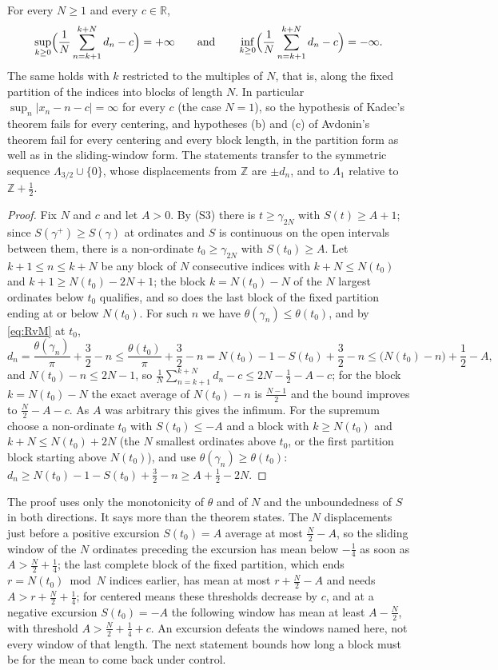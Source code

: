 \documentclass[11pt]{article}
\newcommand{\R}{\mathbb{R}}
\newcommand{\Z}{\mathbb{Z}}
\newcommand{\Lam}{\Lambda}
\begin{document}
\begin{theorem}\label{thm:kadec}
For every $N\ge1$ and every $c\in\R$,
\[
\sup_{k\ge0}\Bigl(\frac1N\sum_{n=k+1}^{k+N}d_n-c\Bigr)=+\infty
\qquad\text{and}\qquad
\inf_{k\ge0}\Bigl(\frac1N\sum_{n=k+1}^{k+N}d_n-c\Bigr)=-\infty .
\]
The same holds with $k$ restricted to the multiples of $N$, that is, along the fixed partition of the indices into blocks of length $N$. In particular $\sup_n|x_n-n-c|=\infty$ for every $c$ (the case $N=1$), so the hypothesis of Kadec's theorem fails for every centering, and hypotheses (b) and (c) of Avdonin's theorem fail for every centering and every block length, in the partition form as well as in the sliding-window form. The statements transfer to the symmetric sequence $\Lam_{3/2}\cup\{0\}$, whose displacements from $\Z$ are $\pm d_n$, and to $\Lam_1$ relative to $\Z+\frac12$.
\end{theorem}

\begin{proof}
Fix $N$ and $c$ and let $A>0$. By (S3) there is $t\ge\gamma_{2N}$ with $S(t)\ge A+1$; since $S(\gamma^+)\ge S(\gamma)$ at ordinates and $S$ is continuous on the open intervals between them, there is a non-ordinate $t_0\ge\gamma_{2N}$ with $S(t_0)\ge A$. Let $k+1\le n\le k+N$ be any block of $N$ consecutive indices with $k+N\le N(t_0)$ and $k+1\ge N(t_0)-2N+1$; the block $k=N(t_0)-N$ of the $N$ largest ordinates below $t_0$ qualifies, and so does the last block of the fixed partition ending at or below $N(t_0)$. For such $n$ we have $\theta(\gamma_n)\le\theta(t_0)$, and by \eqref{eq:RvM} at $t_0$,
\[
d_n=\frac{\theta(\gamma_n)}{\pi}+\frac32-n\le\frac{\theta(t_0)}{\pi}+\frac32-n=N(t_0)-1-S(t_0)+\frac32-n\le\bigl(N(t_0)-n\bigr)+\frac12-A ,
\]
and $N(t_0)-n\le2N-1$, so $\frac1N\sum_{n=k+1}^{k+N}d_n-c\le2N-\frac12-A-c$; for the block $k=N(t_0)-N$ the exact average of $N(t_0)-n$ is $\frac{N-1}{2}$ and the bound improves to $\frac N2-A-c$. As $A$ was arbitrary this gives the infimum. For the supremum choose a non-ordinate $t_0$ with $S(t_0)\le-A$ and a block with $k\ge N(t_0)$ and $k+N\le N(t_0)+2N$ (the $N$ smallest ordinates above $t_0$, or the first partition block starting above $N(t_0)$), and use $\theta(\gamma_n)\ge\theta(t_0)$: $d_n\ge N(t_0)-1-S(t_0)+\frac32-n\ge A+\frac12-2N$.
\end{proof}

The proof uses only the monotonicity of $\theta$ and of $N$ and the unboundedness of $S$ in both directions. It says more than the theorem states. The $N$ displacements just before a positive excursion $S(t_0)=A$ average at most $\frac N2-A$, so the sliding window of the $N$ ordinates preceding the excursion has mean below $-\frac14$ as soon as $A>\frac N2+\frac14$; the last complete block of the fixed partition, which ends $r=N(t_0)\bmod N$ indices earlier, has mean at most $r+\frac N2-A$ and needs $A>r+\frac N2+\frac14$; for centered means these thresholds decrease by $c$, and at a negative excursion $S(t_0)=-A$ the following window has mean at least $A-\frac N2$, with threshold $A>\frac N2+\frac14+c$. An excursion defeats the windows named here, not every window of that length. The next statement bounds how long a block must be for the mean to come back under control.
\end{document}
